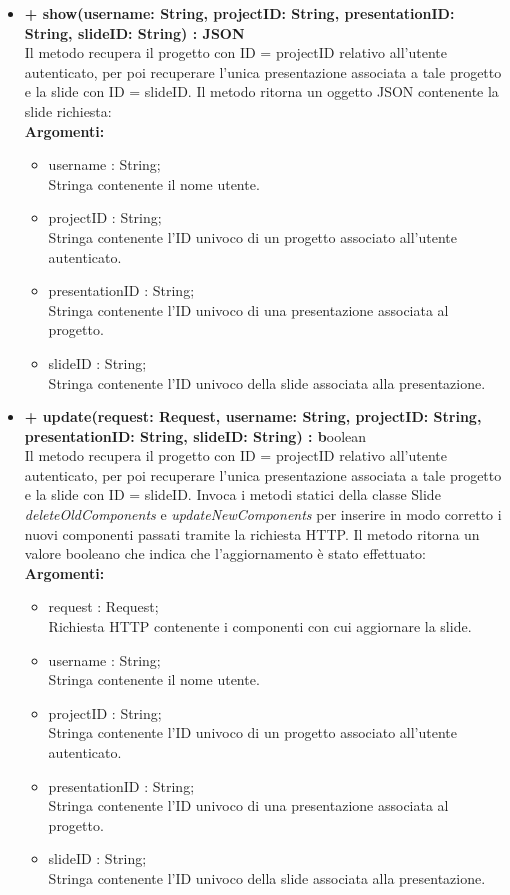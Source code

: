 \begin{itemize}
			\item \textbf{+ show(username: String, projectID: String, presentationID: String, slideID: String) : JSON}\\
				Il metodo recupera il progetto con ID = projectID relativo all'utente autenticato, per poi recuperare l'unica presentazione associata a tale progetto e la slide con ID = slideID. Il metodo ritorna un oggetto JSON contenente la slide richiesta:\\
				\textbf{Argomenti:}
					\begin{itemize}
						\item username : String; \\
						Stringa contenente il nome utente.
						\item projectID : String; \\
						Stringa contenente l'ID univoco di un progetto associato all'utente autenticato.
						\item presentationID : String; \\
						Stringa contenente l'ID univoco di una presentazione associata al progetto.
						\item slideID : String; \\
						Stringa contenente l'ID univoco della slide associata alla presentazione.
					\end{itemize}
					
			\item \textbf{+ update(request: Request, username: String, projectID: String, presentationID: String, slideID: String) : b}oolean\\
				Il metodo recupera il progetto con ID = projectID relativo all'utente autenticato, per poi recuperare l'unica presentazione associata a tale progetto e la slide con ID = slideID. Invoca i metodi statici della classe Slide \textit{deleteOldComponents} e \textit{updateNewComponents} per inserire in modo corretto i nuovi componenti passati tramite la richiesta HTTP. Il metodo ritorna un valore booleano che indica che l'aggiornamento è stato effettuato:\\
					\textbf{Argomenti:}
					\begin{itemize}
						\item request : Request;\\
						Richiesta HTTP contenente i componenti con cui aggiornare la slide.
						\item username : String; \\
						Stringa contenente il nome utente.
						\item projectID : String; \\
						Stringa contenente l'ID univoco di un progetto associato all'utente autenticato.
						\item presentationID : String; \\
						Stringa contenente l'ID univoco di una presentazione associata al progetto.
						\item slideID : String; \\
						Stringa contenente l'ID univoco della slide associata alla presentazione.
					\end{itemize}
					

\end{itemize}
